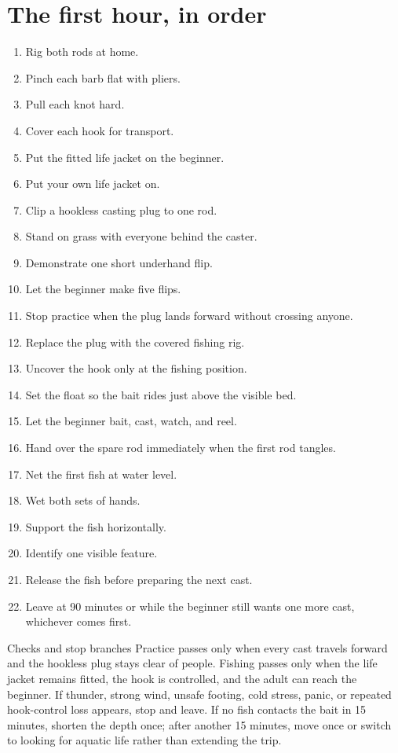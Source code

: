 \section{The first hour, in order}
\begin{enumerate}
\item Rig both rods at home.
\item Pinch each barb flat with pliers.
\item Pull each knot hard.
\item Cover each hook for transport.
\item Put the fitted life jacket on the beginner.
\item Put your own life jacket on.
\item Clip a hookless casting plug to one rod.
\item Stand on grass with everyone behind the caster.
\item Demonstrate one short underhand flip.
\item Let the beginner make five flips.
\item Stop practice when the plug lands forward without crossing anyone.
\item Replace the plug with the covered fishing rig.
\item Uncover the hook only at the fishing position.
\item Set the float so the bait rides just above the visible bed.
\item Let the beginner bait, cast, watch, and reel.
\item Hand over the spare rod immediately when the first rod tangles.
\item Net the first fish at water level.
\item Wet both sets of hands.
\item Support the fish horizontally.
\item Identify one visible feature.
\item Release the fish before preparing the next cast.
\item Leave at 90 minutes or while the beginner still wants one more cast,
whichever comes first.
\end{enumerate}

\begin{telospanel}{Checks and stop branches}
Practice passes only when every cast travels forward and the hookless plug
stays clear of people. Fishing passes only when the life jacket remains fitted,
the hook is controlled, and the adult can reach the beginner. If thunder,
strong wind, unsafe footing, cold stress, panic, or repeated hook-control loss
appears, stop and leave. If no fish contacts the bait in 15 minutes, shorten
the depth once; after another 15 minutes, move once or switch to looking for
aquatic life rather than extending the trip.
\end{telospanel}

